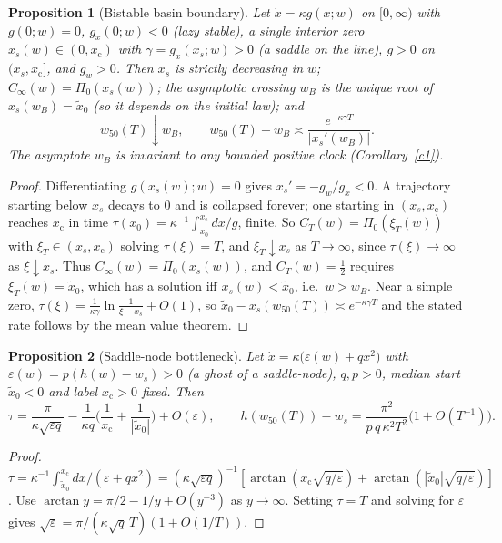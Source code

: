 \documentclass[11pt]{article}
\newtheorem{proposition}{Proposition}
\theoremstyle{definition}
\theoremstyle{remark}
\newcommand{\wfifty}{w_{50}}
\newcommand{\xc}{x_{\mathrm c}}
\newcommand{\xmed}{\tilde x_0}
\begin{document}
\begin{proposition}[Bistable basin boundary]\label{p3}
Let $\dot x=\kappa g(x;w)$ on $[0,\infty)$ with $g(0;w)=0$, $g_x(0;w)<0$ (lazy stable), a single interior zero $x_s(w)\in(0,\xc)$ with $\gamma=g_x(x_s;w)>0$ (a saddle on the line), $g>0$ on $(x_s,\xc]$, and $g_w>0$. Then $x_s$ is strictly decreasing in $w$; $C_\infty(w)=\Pi_0(x_s(w))$; the asymptotic crossing $w_B$ is the unique root of $x_s(w_B)=\xmed$ (so \emph{it depends on the initial law}); and
\[
\wfifty(T)\downarrow w_B,\qquad \wfifty(T)-w_B\asymp\frac{e^{-\kappa\gamma T}}{|x_s'(w_B)|}.
\]
The asymptote $w_B$ is invariant to any bounded positive clock (Corollary~\ref{c1}).
\end{proposition}
\begin{proof}
Differentiating $g(x_s(w);w)=0$ gives $x_s'=-g_w/g_x<0$. A trajectory starting below $x_s$ decays to $0$ and is collapsed forever; one starting in $(x_s,\xc)$ reaches $\xc$ in time $\tau(x_0)=\kappa^{-1}\int_{x_0}^{\xc}dx/g$, finite. So $C_T(w)=\Pi_0(\xi_T(w))$ with $\xi_T\in(x_s,\xc)$ solving $\tau(\xi)=T$, and $\xi_T\downarrow x_s$ as $T\to\infty$, since $\tau(\xi)\to\infty$ as $\xi\downarrow x_s$. Thus $C_\infty(w)=\Pi_0(x_s(w))$, and $C_T(w)=\tfrac12$ requires $\xi_T(w)=\xmed$, which has a solution iff $x_s(w)<\xmed$, i.e.\ $w>w_B$. Near a simple zero, $\tau(\xi)=\frac1{\kappa\gamma}\ln\frac1{\xi-x_s}+O(1)$, so $\xmed-x_s(\wfifty(T))\asymp e^{-\kappa\gamma T}$ and the stated rate follows by the mean value theorem.
\end{proof}

\begin{proposition}[Saddle-node bottleneck]\label{p4}
Let $\dot x=\kappa\big(\varepsilon(w)+qx^2\big)$ with $\varepsilon(w)=p(h(w)-w_s)>0$ (a ghost of a saddle-node), $q,p>0$, median start $\xmed<0$ and label $\xc>0$ fixed. Then
\[
\tau=\frac{\pi}{\kappa\sqrt{\varepsilon q}}-\frac1{\kappa q}\Big(\frac1{\xc}+\frac1{|\xmed|}\Big)+O(\varepsilon),
\qquad
h(\wfifty(T))-w_s=\frac{\pi^2}{p\,q\,\kappa^2T^2}\big(1+O(T^{-1})\big).
\]
\end{proposition}
\begin{proof}
$\tau=\kappa^{-1}\int_{\xmed}^{\xc}dx/(\varepsilon+qx^2)=(\kappa\sqrt{\varepsilon q})^{-1}[\arctan(\xc\sqrt{q/\varepsilon})+\arctan(|\xmed|\sqrt{q/\varepsilon})]$. Use $\arctan y=\pi/2-1/y+O(y^{-3})$ as $y\to\infty$. Setting $\tau=T$ and solving for $\varepsilon$ gives $\sqrt\varepsilon=\pi/(\kappa\sqrt q\,T)(1+O(1/T))$.
\end{proof}
\end{document}

